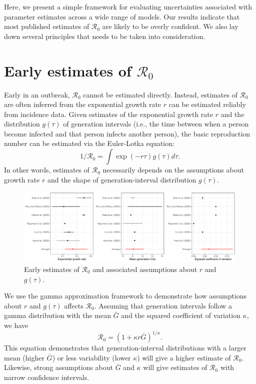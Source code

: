 \documentclass[12pt]{article}
\begin{document}
Here, we present a simple framework for evaluating uncertainties 
associated with parameter estimates
across a wide range of models.
Our results indicate that most published estimates of $\mathcal R_0$
are likely to be overly confident. 
We also lay down several principles that needs to be taken into
consideration.

\section*{Early estimates of $\mathcal R_0$}

Early in an outbreak, $\mathcal R_0$ cannot be estimated directly.
Instead, estimates of $\mathcal R_0$ are often inferred from
the exponential growth rate $r$ can be estimated reliably from incidence data.
Given estimates of the exponential growth rate $r$ and the distribution $g(\tau)$ of 
generation intervals (i.e., the time between when a person become 
infected and that person infects another person), the basic reproduction
number can be estimated via the Euler-Lotka equation:
\begin{equation}
1/\mathcal R_0 = \int \exp(-r\tau) g(\tau) d\tau.
\end{equation}
In other words, estimates of $\mathcal R_0$
necessarily depends on the assumptions about 
growth rate $r$ and the shape of generation-interval distribution $g(\tau)$.

\begin{figure}[t]
\includegraphics[width=\textwidth]{compare_assumption.pdf}
\caption{
Early estimates of $\mathcal R_0$ and associated assumptions about $r$ and $g(\tau)$.
}
\end{figure}

We use the gamma approximation framework to demonstrate
how assumptions about $r$ and $g(\tau)$
affects $\mathcal R_0$.
Assuming that generation intervals follow a gamma distribution 
with the mean $\bar G$ and the squared coefficient of variation $\kappa$, 
we have
\begin{equation}
\mathcal R_0 = \left(1 + \kappa r \bar{G}\right)^{1/\kappa}.
\end{equation}
This equation demonstrates that generation-interval distributions
with a larger mean (higher $\bar{G}$) or less variability (lower $\kappa$)
will give a higher estimate of $\mathcal R_0$.
Likewise, strong assumptions about $\bar{G}$ and $\kappa$ will give
estimates of $\mathcal R_0$ with narrow confidence intervals.
\end{document}
